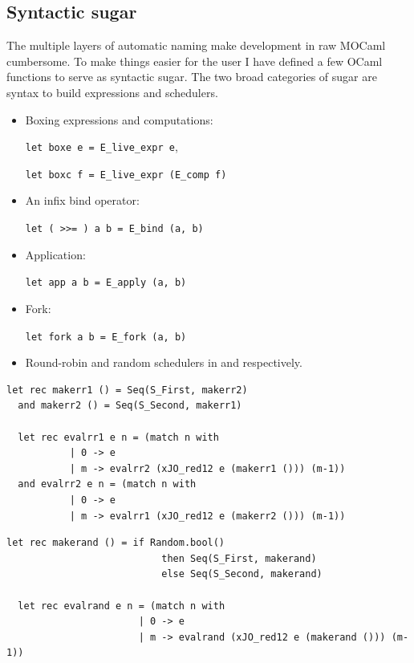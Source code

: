 \documentclass[12pt,twoside,notitlepage]{report}
\theoremstyle{plain}%
\theoremstyle{definition}
\theoremstyle{remark}
\begin{document}
\subsection{Syntactic sugar}
The multiple layers of automatic naming make development in raw MOCaml cumbersome.  To make things easier for the user I have defined a few OCaml functions to serve as syntactic sugar. The two broad categories of sugar are syntax to build expressions and schedulers. 
\begin{itemize}
\item{Boxing expressions and computations:

 \lstinline|let boxe e = E_live_expr e|,
 
 
 \lstinline|let boxc f = E_live_expr (E_comp f)|}
\item{An infix bind operator:


 \lstinline|let ( >>= ) a b = E_bind (a, b)|}
\item{Application:


 \lstinline|let app a b = E_apply (a, b)|}
\item{Fork:


 \lstinline|let fork a b = E_fork (a, b)|}
\item{Round-robin and random schedulers in  and  respectively.\label{sec:random_sched}}
\end{itemize}
\begin{minipage}{\linewidth}

\begin{lstlisting}[caption={OCaml round-robin scheduler}, label={lst:ocamlrrsched}]
  let rec makerr1 () = Seq(S_First, makerr2) 
  and makerr2 () = Seq(S_Second, makerr1) 
  
  let rec evalrr1 e n = (match n with 
           | 0 -> e
           | m -> evalrr2 (xJO_red12 e (makerr1 ())) (m-1))
  and evalrr2 e n = (match n with 
           | 0 -> e
           | m -> evalrr1 (xJO_red12 e (makerr2 ())) (m-1))
\end{lstlisting}

\end{minipage}
\begin{minipage}{\linewidth}

\begin{lstlisting}[caption={OCaml random scheduler}, label={lst:ocamlrandsched}]
  let rec makerand () = if Random.bool() 
                           then Seq(S_First, makerand) 
                           else Seq(S_Second, makerand)
  
  let rec evalrand e n = (match n with 
                       | 0 -> e
                       | m -> evalrand (xJO_red12 e (makerand ())) (m-1))
\end{lstlisting}

\end{minipage}
\end{document}

